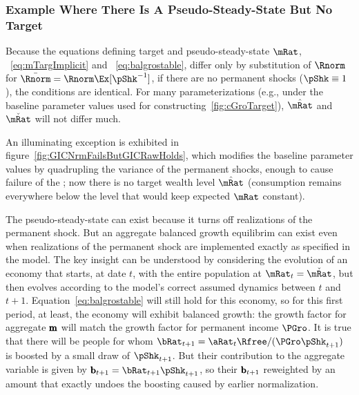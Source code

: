 \documentclass[BufferStockTheory]{subfiles}
\begin{document}

\subsubsection{Example Where There Is A Pseudo-Steady-State But No Target}

Because the equations defining target and pseudo-steady-state $\mRat$, ~\eqref{eq:mTargImplicit} and ~\eqref{eq:balgrostable}, differ only by substitution of $\Rnorm$ for $\bar{\Rnorm}=\Rnorm \Ex[\pShk^{-1}]$, if there are no permanent shocks ($\pShk \equiv 1$), the conditions are identical.  For many parameterizations (e.g., under the baseline parameter values used for constructing~\ref{fig:cGroTarget}), $\Trg{\mRat}$ and $\StE{\mRat}$ will not differ much.

An illuminating exception is exhibited in figure~\ref{fig:GICNrmFailsButGICRawHolds}, which modifies the baseline parameter values by quadrupling the variance of the permanent shocks, enough to cause failure of the \GICNrm; now there is no target wealth level $\Trg{\mRat}$ (consumption remains everywhere below the level that would keep expected $\mRat$ constant).  


\renewcommand{\figFile}{GICNrmFailsButGICRawHolds}
\hypertarget{\figFile}{}



The pseudo-steady-state can exist because it turns off realizations of the permanent shock.  But an aggregate balanced growth equilibrim can exist even when realizations of the permanent shock are implemented exactly as specified in the model.  The key insight can be understood by considering the evolution of an economy that starts, at date $t$, with the entire population at $\mRat_{t}=\StE{\mRat}$, but then evolves according to the model's correct assumed dynamics between $t$ and $t+1$.  Equation~\eqref{eq:balgrostable} will still hold for this economy, so for this first period, at least, the economy will exhibit balanced growth: the growth factor for aggregate $\pmb{\mathrm{m}}$ will match the growth factor for permanent income $\PGro$.  It is true that there will be people for whom $\bRat_{t+1}=\aRat_{t}\Rfree/(\PGro\pShk_{t+1})$ is boosted by a small draw of $\pShk_{t+1}$.  But their contribution to the aggregate variable is given by $\bRatBF_{t+1}=\bRat_{t+1}\pShk_{t+1}$, so their $\pmb{\mathrm{b}}_{t+1}$ reweighted by an amount that exactly undoes the boosting caused by earlier normalization.
\end{document}
